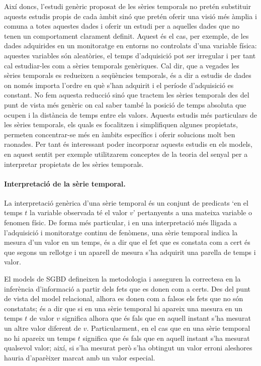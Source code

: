 


Així doncs, l'estudi genèric proposat de les sèries temporals no
pretén substituir aquests estudis propis de cada àmbit sinó que pretén
oferir una visió més àmplia i comuna a totes aquestes dades i oferir
un estudi per a aquelles dades que no tenen un comportament clarament
definit. Aquest és el cas, per exemple, de les dades adquirides en un
monitoratge en entorns no controlats d'una variable física: aquestes
variables són aleatòries, el temps d'adquisició pot ser irregular i
per tant cal estudiar-les com a sèries temporals genèriques.
Cal dir, que a vegades les sèries temporals es redueixen a seqüències
temporals, és a dir a estudis de dades on només importa l'ordre en què
s'han adquirit i el període d'adquisició es constant. No fem
aquesta reducció sinó que tractem les sèries temporals des del punt de
vista més genèric on cal saber també la posició de temps absoluta que
ocupen i la distància de temps entre els valors.
Aquests estudis més particulars de les sèries temporals, els quals es
focalitzen i simplifiquen algunes propietats, permeten concentrar-se
més en àmbits específics i oferir solucions molt ben raonades.  Per
tant és interessant poder incorporar aquests estudis en els models, en
aquest sentit per exemple utilitzarem conceptes de la teoria del
senyal per a interpretar propietats de les sèries temporals.




\paragraph{Interpretació de la sèrie temporal.} 
La interpretació genèrica d'una sèrie temporal és un conjunt de
predicats `en el temps $t$ la variable observada té el valor $v$'
pertanyents a una mateixa variable o fenomen físic.  De forma més
particular, i en una interpretació més lligada a l'adquisició i
monitoratge continu de fenòmens, una sèrie temporal indica la mesura
d'un valor en un temps, és a dir que el fet que es constata com a cert
és que segons un rellotge i un aparell de mesura s'ha adquirit una
parella de temps i valor.  


El models de \gls{SGBD} defineixen la metodologia i asseguren la
correctesa en la inferència d'informació a partir dels fets que es
donen com a certs. Des del punt de vista del model relacional, alhora
es donen com a falsos els fets que no són constatats; és a dir que si
en una sèrie temporal hi apareix una mesura en un temps $t$ de valor
$v$ significa alhora que és fals que en aquell instant s'ha mesurat un
altre valor diferent de $v$. Particularment, en el cas que en una
sèrie temporal no hi apareix un temps $t$ significa que és fals que en
aquell instant s'ha mesurat qualsevol valor; així, si s'ha mesurat
però s'ha obtingut un valor erroni aleshores hauria d'aparèixer marcat
amb un valor especial.

